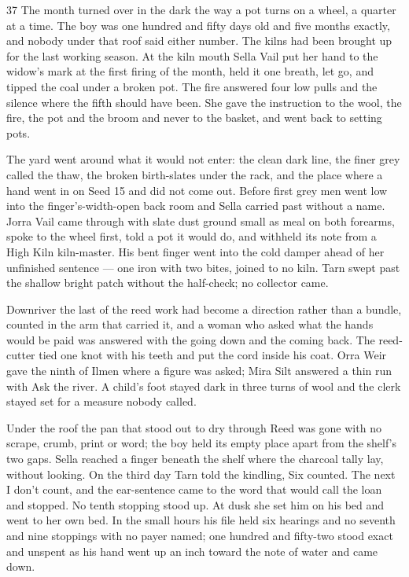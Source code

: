 \begin{CRchronicle}{37}
The month turned over in the dark the way a pot turns on a wheel, a quarter at a time. The boy was one hundred and fifty days old and five months exactly, and nobody under that roof said either number. The kilns had been brought up for the last working season. At the kiln mouth Sella Vail put her hand to the widow’s mark at the first firing of the month, held it one breath, let go, and tipped the coal under a broken pot. The fire answered four low pulls and the silence where the fifth should have been. She gave the instruction to the wool, the fire, the pot and the broom and never to the basket, and went back to setting pots.

The yard went around what it would not enter: the clean dark line, the finer grey called the thaw, the broken birth-slates under the rack, and the place where a hand went in on Seed 15 and did not come out. Before first grey men went low into the finger’s-width-open back room and Sella carried past without a name. Jorra Vail came through with slate dust ground small as meal on both forearms, spoke to the wheel first, told a pot it would do, and withheld its note from a High Kiln kiln-master. His bent finger went into the cold damper ahead of her unfinished sentence --- one iron with two bites, joined to no kiln. Tarn swept past the shallow bright patch without the half-check; no collector came.

Downriver the last of the reed work had become a direction rather than a bundle, counted in the arm that carried it, and a woman who asked what the hands would be paid was answered with the going down and the coming back. The reed-cutter tied one knot with his teeth and put the cord inside his coat. Orra Weir gave the ninth of Ilmen where a figure was asked; Mira Silt answered a thin run with Ask the river. A child’s foot stayed dark in three turns of wool and the clerk stayed set for a measure nobody called.

Under the roof the pan that stood out to dry through Reed was gone with no scrape, crumb, print or word; the boy held its empty place apart from the shelf’s two gaps. Sella reached a finger beneath the shelf where the charcoal tally lay, without looking. On the third day Tarn told the kindling, Six counted. The next I don’t count, and the ear-sentence came to the word that would call the loan and stopped. No tenth stopping stood up. At dusk she set him on his bed and went to her own bed. In the small hours his file held six hearings and no seventh and nine stoppings with no payer named; one hundred and fifty-two stood exact and unspent as his hand went up an inch toward the note of water and came down.
\end{CRchronicle}
